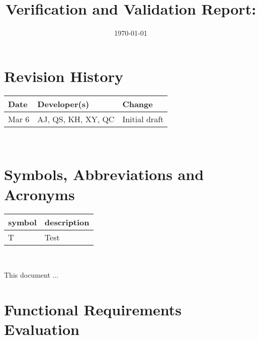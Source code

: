 \documentclass[12pt, titlepage]{article}
\begin{document}
\title{Verification and Validation Report: \progname} 
\author{\authname}
\date{\today}
	
\maketitle


\section{Revision History}

\begin{tabularx}{\textwidth}{llX}
  \toprule {\bf Date} & {\bf Developer(s)} & {\bf Change} \\
  \midrule  
Mar 6 & AJ, QS, KH, XY, QC & Initial draft \\
\bottomrule
\end{tabularx}

~\newpage

\section{Symbols, Abbreviations and Acronyms}

\renewcommand{\arraystretch}{1.2}
\begin{tabular}{l l} 
  \toprule		
  \textbf{symbol} & \textbf{description}\\
  \midrule 
  T & Test\\
  \bottomrule
\end{tabular}\\


\newpage

\tableofcontents

\listoftables %

\listoffigures %

\newpage


This document ...

\section{Functional Requirements Evaluation}
\end{document}
